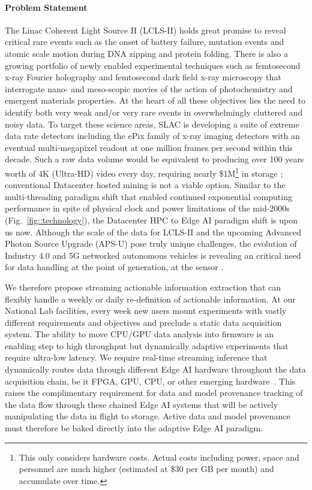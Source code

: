 \documentclass{article}
\begin{document}
\paragraph{Problem Statement}%
The Linac Coherent Light Source II (LCLS-II) holds great promise to reveal critical rare events such as the onset of battery failure, mutation events and atomic scale motion during DNA zipping and protein folding.
There is also a growing portfolio of newly enabled experimental techniques such as femtosecond x-ray Fourier holography \cite{Tais2018} and femtosecond dark field x-ray microscopy \cite{Simons2015} that interrogate nano- and meso-scopic movies of the action of photochemistry and emergent materials properties.
At the heart of all these objectives lies the need to identify both very weak and/or very rare events in overwhelmingly cluttered and noisy data. 
To target these science areas, SLAC is developing a suite of extreme data rate detectors including the ePix family of x-ray imaging detectors with an eventual multi-megapixel readout at one million frames per second within this decade.
Such a raw data volume would be equivalent to producing over 100 years worth of 4K (Ultra-HD) video \cite{HowBigVideo} every day, requiring nearly \$1M\footnote{This only considers hardware costs. Actual costs including power, space and personnel are much higher (estimated at \$30 per GB per month) and accumulate over time.} in storage \cite{CostPerTB}; conventional Datacenter hosted mining is not a viable option.
Similar to the multi-threading paradigm shift that enabled continued exponential computing performance in spite of physical clock and power limitations of the mid-2000s (Fig.~\ref{fig::technology}), the Datacenter HPC to Edge AI paradigm shift is upon us now.
Although the scale of the data for LCLS-II and the upcoming Advanced Photon Source Upgrade (APS-U) pose truly unique challenges, the evolution of Industry 4.0 and 5G networked autonomous vehicles is revealing an critical need for data handling at the point of generation, at the sensor \cite{Gartner2018,NetworkWorld2019}.

We therefore propose streaming actionable information extraction that can flexibly handle a weekly or daily re-definition of actionable information.
At our National Lab facilities, every week new users mount experiments with vastly different requirements and objectives and preclude a static data acquisition system. 
The ability to move CPU/GPU data analysis into firmware is an enabling step to high throughput but dynamically adaptive experiments that require ultra-low latency.
We require real-time streaming inference that dynamically routes data through different Edge AI hardware throughout the data acquisition chain, be it FPGA, GPU, CPU, or other emerging hardware~\cite{edgetpu_benchmarks,edgetpu,waveCGRA,CGRAreview,seaofcores}.
This raises the complimentary requirement for data and model provenance tracking of the data flow through these chained Edge AI systems that will be actively manipulating the data in flight to storage.
Active data and model provenance must therefore be baked directly into the adaptive Edge AI paradigm.
\end{document}
